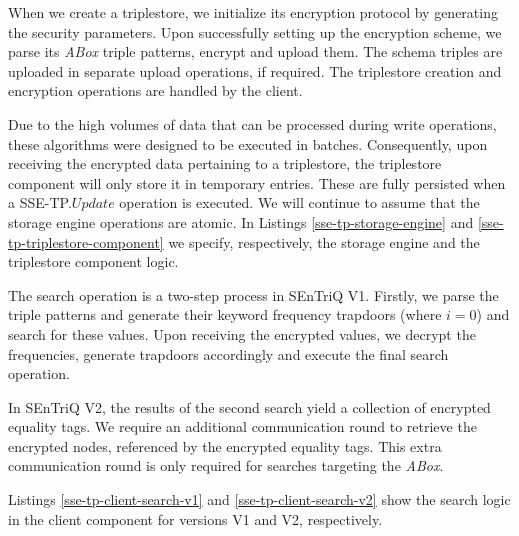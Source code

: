 When we create a triplestore, we initialize its encryption protocol by generating the security parameters. Upon successfully setting up the encryption scheme, we parse its \emph{ABox} triple patterns, encrypt and upload them. The schema triples are uploaded in separate upload operations, if required. The triplestore creation and encryption operations are handled by the client.

Due to the high volumes of data that can be processed during write operations, these algorithms were designed to be executed in batches. Consequently, upon receiving the encrypted data pertaining to a triplestore, the triplestore component will only store it in temporary entries. These are fully persisted when a SSE-TP.$Update$ operation is executed. We will continue to assume that the storage engine operations are atomic. In Listings \ref{sse-tp-storage-engine} and \ref{sse-tp-triplestore-component} we specify, respectively, the storage engine and the triplestore component logic.

%

%

The search operation is a two-step process in \gls{SEnTriQ} V1. Firstly, we parse the triple patterns and generate their keyword frequency trapdoors (where $i = 0$) and search for these values. Upon receiving the encrypted values, we decrypt the frequencies, generate trapdoors accordingly and execute the final search operation.

In \gls{SEnTriQ} V2, the results of the second search yield a collection of encrypted equality tags. We require an additional communication round to retrieve the encrypted nodes, referenced by the encrypted equality tags. This extra communication round is only required for searches targeting the \emph{ABox}.

Listings \ref{sse-tp-client-search-v1} and \ref{sse-tp-client-search-v2} show the search logic in the client component for versions V1 and V2, respectively.

%

%

